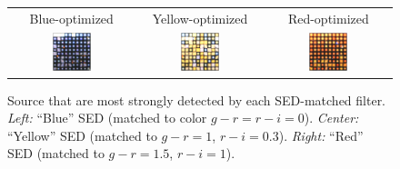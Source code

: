 \documentclass[11pt,letterpaper,linenumbers]{aastex63}
\begin{document}
\begin{figure}
  \begin{center}
    \begin{tabular}{@{}c@{}c@{}c@{}}
      Blue-optimized & Yellow-optimized & Red-optimized \\
      \includegraphics[width=0.33\textwidth]{best-blue} &
      \includegraphics[width=0.33\textwidth]{best-yellow} &
      \includegraphics[width=0.33\textwidth]{best-red}
    \end{tabular}
    \caption{Source that are most strongly detected by each
      SED-matched filter.  \emph{Left:} ``Blue'' SED (matched to color
      $g-r = r-i = 0$).  \emph{Center:} ``Yellow'' SED (matched to
      $g-r = 1$, $r-i = 0.3$).  \emph{Right:} ``Red'' SED (matched to
      $g-r = 1.5$, $r-i = 1$).
    \label{fig:bestsed}}
  \end{center}
\end{figure}

\end{document}
